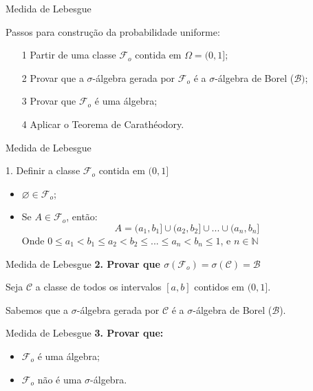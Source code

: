 \documentclass[10pt]{beamer}
\begin{document}
\begin{frame}[fragile]{Medida de Lebesgue}
\begin{block}{Passos para construção da probabilidade uniforme:}
\begin{itemize}
    \item[1] Partir de uma classe $\mathcal{F}_o$ contida em $\Omega=(0,1]$;
    \item[2] Provar que a $\sigma$-álgebra gerada por $\mathcal{F}_o$ é a $\sigma$-álgebra de Borel ($\mathcal{B})$;
    \item[3] Provar que $\mathcal{F}_o$ é uma álgebra;
    \item[4] Aplicar o Teorema de Carathéodory.
\end{itemize}
\end{block}
\end{frame}

\begin{frame}[fragile]{Medida de Lebesgue}
\begin{block}{1. Definir a classe $\mathcal{F}_o$ contida em $(0,1]$}
\begin{itemize}
    \item $\varnothing \in \mathcal{F}_o$;
    \item Se $A \in \mathcal{F}_o$, então:
    $$A = (a_1,b_1] \cup (a_2,b_2] \cup ... \cup (a_n,b_n]$$
    Onde $0\leq a_1 < b_1 \leq a_2 < b_2 \leq ... \leq a_n < b_n \leq 1$, e $n \in \mathbb{N}$
\end{itemize}
\end{block}
\end{frame}

\begin{frame}[fragile]{Medida de Lebesgue}
\textbf{2. Provar que $\sigma(\mathcal{F}_o)=\sigma(\mathcal{C}) =\mathcal{B}$}

Seja $\mathcal{C}$ a classe de todos os intervalos $[a,b]$ contidos em $(0,1]$.

Sabemos que a $\sigma$-álgebra gerada por $\mathcal{C}$ é a $\sigma$-álgebra de Borel ($\mathcal{B}$).
\end{frame}

\begin{frame}[fragile]{Medida de Lebesgue}
\textbf{3. Provar que:}
\begin{itemize}
    \item $\mathcal{F}_o$ é uma álgebra;
    \item $\mathcal{F}_o$ não é uma $\sigma$-álgebra.
\end{itemize}
\end{frame}
\end{document}
